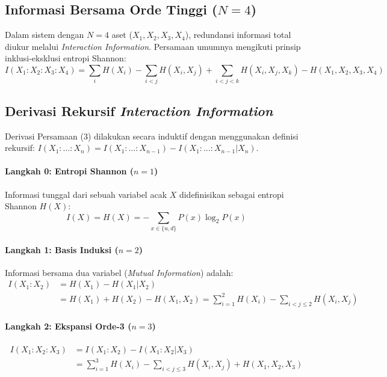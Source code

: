 \subsection{Informasi Bersama Orde Tinggi ($N=4$)}
Dalam sistem dengan $N=4$ aset ($X_1, X_2, X_3, X_4$), redundansi informasi total diukur melalui \textit{Interaction Information}. Persamaan umumnya mengikuti prinsip inklusi-eksklusi entropi Shannon:
\begin{equation}
    I(X_1:X_2:X_3:X_4) = \sum_{i} H(X_i) - \sum_{i<j} H(X_i, X_j) + \sum_{i<j<k} H(X_i, X_j, X_k) - H(X_1, X_2, X_3, X_4)
\end{equation}

\subsection{Derivasi Rekursif \textit{Interaction Information}}
Derivasi Persamaan (3) dilakukan secara induktif dengan menggunakan definisi rekursif: $I(X_1: \dots :X_n) = I(X_1: \dots :X_{n-1}) - I(X_1: \dots :X_{n-1} | X_n)$.

\paragraph{Langkah 0: Entropi Shannon ($n=1$)}
Informasi tunggal dari sebuah variabel acak $X$ didefinisikan sebagai entropi Shannon $H(X)$:
\begin{equation}
    I(X) = H(X) = - \sum_{x \in \{u,d\}} P(x) \log_2 P(x)
\end{equation}

\paragraph{Langkah 1: Basis Induksi ($n=2$)}
Informasi bersama dua variabel (\textit{Mutual Information}) adalah:
\begin{equation}
\begin{aligned}
    I(X_1:X_2) &= H(X_1) - H(X_1 | X_2) \\
    &= H(X_1) + H(X_2) - H(X_1, X_2) = \sum_{i=1}^2 H(X_i) - \sum_{i<j \le 2} H(X_i, X_j)
\end{aligned}
\end{equation}

\paragraph{Langkah 2: Ekspansi Orde-3 ($n=3$)}
\begin{equation}
\begin{aligned}
    I(X_1:X_2:X_3) &= I(X_1:X_2) - I(X_1:X_2 | X_3) \\
    &= \sum_{i=1}^3 H(X_i) - \sum_{i<j \le 3} H(X_i, X_j) + H(X_1, X_2, X_3)
\end{aligned}
\end{equation}

